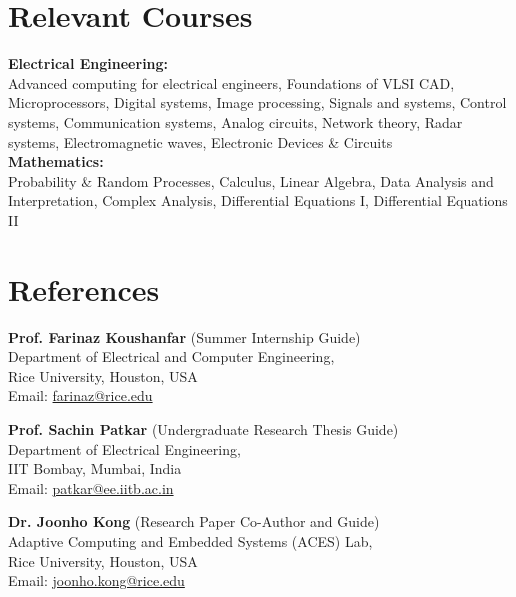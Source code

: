 \documentclass[margin,line]{resume}
\begin{document}
\begin{resume}
\section{\mysidestyle Relevant Courses}
\vspace{0mm}
    {\bf Electrical Engineering:} \\
	Advanced computing for electrical engineers, Foundations of VLSI CAD, Microprocessors, Digital systems, Image processing, Signals and systems, Control systems, Communication systems, Analog circuits, Network theory, Radar systems, Electromagnetic waves, Electronic Devices \& Circuits\\
    {\bf Mathematics:} \\
	Probability \& Random Processes, Calculus, Linear Algebra, Data Analysis and Interpretation, Complex Analysis, Differential Equations I, Differential Equations II
	
\section{\mysidestyle References}
	\begin{list1}
    
	\item \textbf{Prof. Farinaz Koushanfar} (Summer Internship Guide)\\
	Department of Electrical and Computer Engineering,\\
	Rice University, Houston, USA\\
	Email: \url {farinaz@rice.edu}\\

	\item \textbf{Prof. Sachin Patkar} (Undergraduate Research Thesis Guide)\\
	Department of Electrical Engineering,\\
	IIT Bombay, Mumbai, India\\
	Email: \url {patkar@ee.iitb.ac.in}\\

	\item \textbf{Dr. Joonho Kong} (Research Paper Co-Author and Guide)\\
	Adaptive Computing and Embedded Systems (ACES) Lab,\\
	Rice University, Houston, USA\\
	Email: \url{joonho.kong@rice.edu}\\
    
	\end{list1}
\end{resume}
\end{document}
